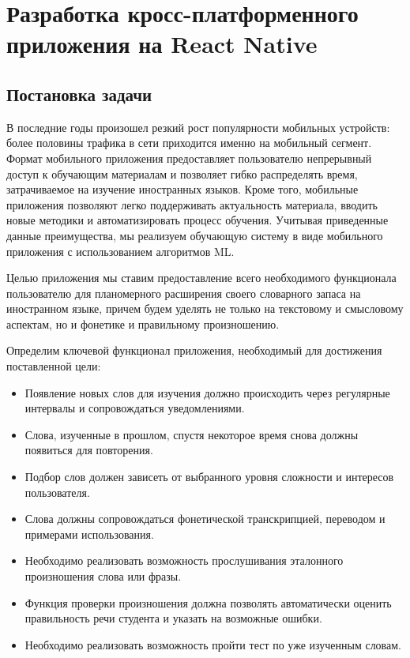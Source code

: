 \section{Разработка кросс-платформенного приложения на React Native}
\label{sec:section-2}

\subsection{Постановка задачи}
В последние годы произошел резкий рост популярности мобильных устройств: более половины трафика в сети приходится именно на мобильный сегмент\cite{mobile-traffic-stats}. Формат мобильного приложения предоставляет пользователю непрерывный доступ к обучающим материалам и позволяет гибко распределять время, затрачиваемое на изучение иностранных языков. Кроме того, мобильные приложения позволяют легко поддерживать актуальность материала, вводить новые методики и автоматизировать процесс обучения. Учитывая приведенные данные преимущества, мы реализуем обучающую систему в виде мобильного приложения с использованием алгоритмов ML.

Целью приложения мы ставим предоставление всего необходимого функционала пользователю для планомерного расширения своего словарного запаса на иностранном языке, причем будем уделять не только на текстовому и смысловому аспектам, но и фонетике и правильному произношению.

Определим ключевой функционал приложения, необходимый для достижения поставленной цели:
\begin{itemize}
	\item Появление новых слов для изучения должно происходить через регулярные интервалы и сопровождаться уведомлениями.
	\item Слова, изученные в прошлом, спустя некоторое время снова должны появиться для повторения.
	\item Подбор слов должен зависеть от выбранного уровня сложности и интересов пользователя.
	\item Слова должны сопровождаться фонетической транскрипцией, переводом и примерами использования.
	\item Необходимо реализовать возможность прослушивания эталонного произношения слова или фразы.
	\item Функция проверки произношения должна позволять автоматически оценить правильность речи студента и указать на возможные ошибки.
	\item Необходимо реализовать возможность пройти тест по уже изученным словам.
\end{itemize}

